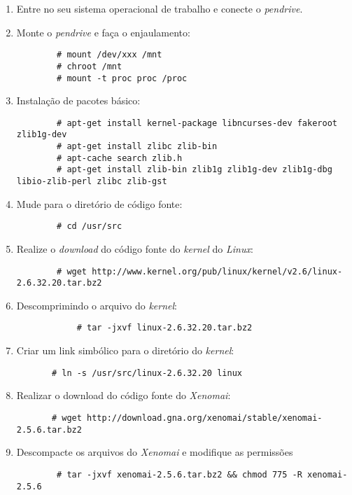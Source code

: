 \documentclass[a4paper,10pt]{article}
\begin{document}
      \begin{enumerate}
	\item Entre no seu sistema operacional de trabalho e conecte o \emph{pendrive}.
	\item Monte o \emph{pendrive} e faça o enjaulamento:
	  \begin{lstlisting}
	    # mount /dev/xxx /mnt
	    # chroot /mnt
	    # mount -t proc proc /proc
	  \end{lstlisting}

	\item Instalação de pacotes básico:
	  \begin{lstlisting}
	    # apt-get install kernel-package libncurses-dev fakeroot zlib1g-dev
	    # apt-get install zlibc zlib-bin
	    # apt-cache search zlib.h
	    # apt-get install zlib-bin zlib1g zlib1g-dev zlib1g-dbg libio-zlib-perl zlibc zlib-gst	
	  \end{lstlisting}

	\item Mude para o diretório de código fonte:
	  \begin{lstlisting}
	    # cd /usr/src 
	  \end{lstlisting}

	\item Realize o \emph{download} do código fonte do \emph{kernel} do \emph{Linux}:
	  \begin{lstlisting}
	    # wget http://www.kernel.org/pub/linux/kernel/v2.6/linux-2.6.32.20.tar.bz2
	  \end{lstlisting}

	\item Descomprimindo o arquivo do \emph{kernel}:
	  \begin{lstlisting}
    	    # tar -jxvf linux-2.6.32.20.tar.bz2
	  \end{lstlisting}

	\item Criar um link simbólico para o diretório do \emph{kernel}:
	  \begin{lstlisting}
	   # ln -s /usr/src/linux-2.6.32.20 linux
	  \end{lstlisting}

	\item Realizar o download do código fonte do \emph{Xenomai}:
	  \begin{lstlisting}
	   # wget http://download.gna.org/xenomai/stable/xenomai-2.5.6.tar.bz2
	  \end{lstlisting}

	\item Descompacte os arquivos do \emph{Xenomai} e modifique as permissões
	  \begin{lstlisting}
	    # tar -jxvf xenomai-2.5.6.tar.bz2 && chmod 775 -R xenomai-2.5.6
	  \end{lstlisting}


\end{enumerate}
\end{document}
